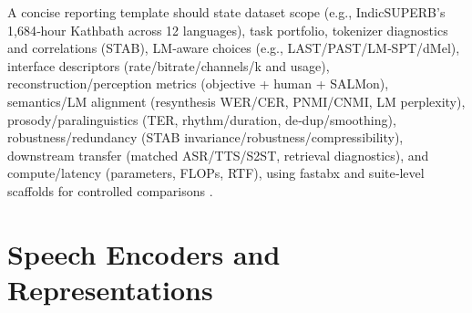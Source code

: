 \documentclass{article}
\begin{document}
A concise reporting template should state dataset scope (e.g., IndicSUPERB’s 1,684‑hour Kathbath across 12 languages), task portfolio, tokenizer diagnostics and correlations (STAB), LM‑aware choices (e.g., LAST/PAST/LM‑SPT/dMel), interface descriptors (rate/bitrate/channels/k and usage), reconstruction/perception metrics (objective + human + SALMon), semantics/LM alignment (resynthesis WER/CER, PNMI/CNMI, LM perplexity), prosody/paralinguistics (TER, rhythm/duration, de‑dup/smoothing), robustness/redundancy (STAB invariance/robustness/compressibility), downstream transfer (matched ASR/TTS/S2ST, retrieval diagnostics), and compute/latency (parameters, FLOPs, RTF), using fastabx and suite‑level scaffolds for controlled comparisons \cite{vashishth2024stabspeechtokenizerassessmentbenchmark,turetzky2024lastlanguagemodelawarespeechtokenization,har-tuv2025pastphoneticacousticspeechtokenizer,bai2025dmelspeechtokenizationmadesimple,jo2025lmsptalignedsemanticdistillationspeechto,poli2025fastabxlibraryefficientcomputationabxdis,entry2025indicsuperbspeechprocessinguniversalperf}.

















\section{Speech Encoders and Representations} \label{sec:Speech Encoders and Representations}
\end{document}
